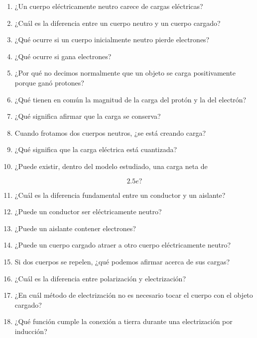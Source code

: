 \begin{enumerate}

    \item ¿Un cuerpo eléctricamente neutro carece de cargas eléctricas?

    \item ¿Cuál es la diferencia entre un cuerpo neutro y un cuerpo cargado?

    \item ¿Qué ocurre si un cuerpo inicialmente neutro pierde electrones?

    \item ¿Qué ocurre si gana electrones?

    \item ¿Por qué no decimos normalmente que un objeto se carga
    positivamente porque ganó protones?

    \item ¿Qué tienen en común la magnitud de la carga del protón y la del
    electrón?

    \item ¿Qué significa afirmar que la carga se conserva?

    \item Cuando frotamos dos cuerpos neutros, ¿se está creando carga?

    \item ¿Qué significa que la carga eléctrica está cuantizada?

    \item ¿Puede existir, dentro del modelo estudiado, una carga neta de

    \[
    2.5e?
    \]

    \item ¿Cuál es la diferencia fundamental entre un conductor y un
    aislante?

    \item ¿Puede un conductor ser eléctricamente neutro?

    \item ¿Puede un aislante contener electrones?

    \item ¿Puede un cuerpo cargado atraer a otro cuerpo eléctricamente
    neutro?

    \item Si dos cuerpos se repelen, ¿qué podemos afirmar acerca de sus
    cargas?

    \item ¿Cuál es la diferencia entre polarización y electrización?

    \item ¿En cuál método de electrización no es necesario tocar el cuerpo
    con el objeto cargado?

    \item ¿Qué función cumple la conexión a tierra durante una electrización
    por inducción?

\end{enumerate}


